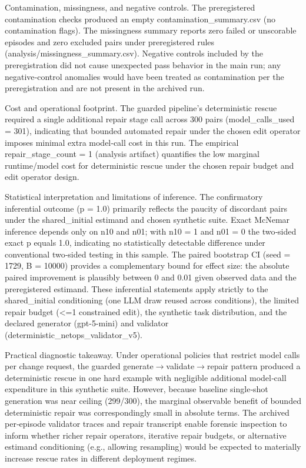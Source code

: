 \documentclass[conference]{IEEEtran}
\begin{document}
Contamination, missingness, and negative controls. The preregistered contamination checks produced an empty contamination\_summary.csv (no contamination flags). The missingness summary reports zero failed or unscorable episodes and zero excluded pairs under preregistered rules (analysis/missingness\_summary.csv). Negative controls included by the preregistration did not cause unexpected pass behavior in the main run; any negative‑control anomalies would have been treated as contamination per the preregistration and are not present in the archived run.

Cost and operational footprint. The guarded pipeline's deterministic rescue required a single additional repair stage call across 300 pairs (model\_calls\_used = 301), indicating that bounded automated repair under the chosen edit operator imposes minimal extra model‑call cost in this run. The empirical repair\_stage\_count = 1 (analysis artifact) quantifies the low marginal runtime/model cost for deterministic rescue under the chosen repair budget and edit operator design.

Statistical interpretation and limitations of inference. The confirmatory inferential outcome (p = 1.0) primarily reflects the paucity of discordant pairs under the shared\_initial estimand and chosen synthetic suite. Exact McNemar inference depends only on n10 and n01; with n10 = 1 and n01 = 0 the two‑sided exact p equals 1.0, indicating no statistically detectable difference under conventional two‑sided testing in this sample. The paired bootstrap CI (seed = 1729, B = 10000) provides a complementary bound for effect size: the absolute paired improvement is plausibly between 0 and 0.01 given observed data and the preregistered estimand. These inferential statements apply strictly to the shared\_initial conditioning (one LLM draw reused across conditions), the limited repair budget (<=1 constrained edit), the synthetic task distribution, and the declared generator (gpt-5-mini) and validator (deterministic\_netops\_validator\_v5).

Practical diagnostic takeaway. Under operational policies that restrict model calls per change request, the guarded generate\ensuremath{\rightarrow}validate\ensuremath{\rightarrow}repair pattern produced a deterministic rescue in one hard example with negligible additional model‑call expenditure in this synthetic suite. However, because baseline single‑shot generation was near ceiling (299/300), the marginal observable benefit of bounded deterministic repair was correspondingly small in absolute terms. The archived per‑episode validator traces and repair transcript enable forensic inspection to inform whether richer repair operators, iterative repair budgets, or alternative estimand conditioning (e.g., allowing resampling) would be expected to materially increase rescue rates in different deployment regimes.
\end{document}
